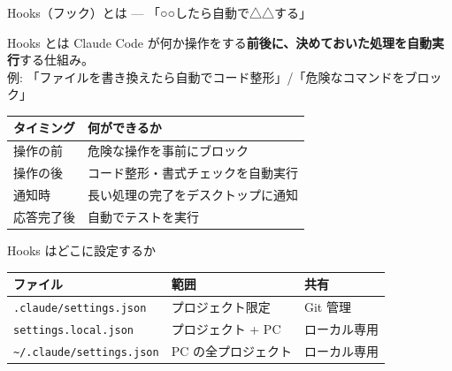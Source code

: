\documentclass[aspectratio=169, 14pt]{beamer}
\begin{document}

\begin{frame}{Hooks（フック）とは — 「○○したら自動で△△する」}
  \begin{block}{Hooks とは}
    {\scriptsize Claude Code が何か操作をする\textbf{前後に、決めておいた処理を自動実行}する仕組み。\\
    例: 「ファイルを書き換えたら自動でコード整形」/「危険なコマンドをブロック」}
  \end{block}

  \vspace{0.2em}

  {\scriptsize
  \begin{tabular}{lp{60mm}}
    \hline
    \textbf{タイミング} & \textbf{何ができるか} \\
    \hline
    操作の前  & 危険な操作を事前にブロック \\
    操作の後  & コード整形・書式チェックを自動実行 \\
    通知時    & 長い処理の完了をデスクトップに通知 \\
    応答完了後 & 自動でテストを実行 \\
    \hline
  \end{tabular}
  }

  \vspace{0.2em}

  \begin{alertblock}{Hooks はどこに設定するか}
    {\scriptsize
    \begin{tabular}{lll}
      \hline
      \textbf{ファイル} & \textbf{範囲} & \textbf{共有} \\
      \hline
      \texttt{.claude/settings.json} &
        プロジェクト限定 &
        Git 管理 \\
      \texttt{settings.local.json} &
        プロジェクト + PC &
        ローカル専用 \\
      \texttt{\textasciitilde/.claude/settings.json} &
        PC の全プロジェクト &
        ローカル専用 \\
      \hline
    \end{tabular}
    }
  \end{alertblock}
\end{frame}
\end{document}
